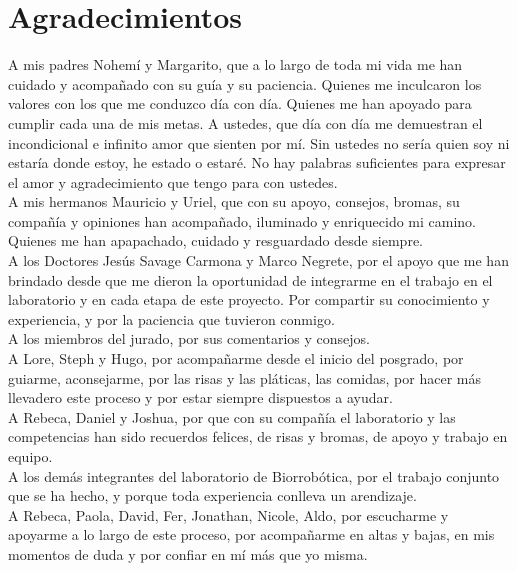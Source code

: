 \chapter*{Agradecimientos}

A mis padres Nohemí y Margarito, que a lo largo de toda mi vida me han cuidado y acompañado con su guía y su paciencia. Quienes me inculcaron los valores con los que me conduzco día con día. Quienes me han apoyado para cumplir cada una de mis metas. A ustedes, que día con día me demuestran el incondicional e infinito amor que sienten por mí. Sin ustedes no sería quien soy ni estaría donde estoy, he estado o estaré. No hay palabras suficientes para expresar el amor y agradecimiento que tengo para con ustedes.\\

A mis hermanos Mauricio y Uriel, que con su apoyo, consejos, bromas, su compañía y opiniones han acompañado, iluminado y enriquecido mi camino. Quienes me han apapachado, cuidado y resguardado desde siempre.\\

A los Doctores Jesús Savage Carmona y Marco Negrete, por el apoyo que me han brindado desde que me dieron la oportunidad de integrarme en el trabajo en el laboratorio y en cada etapa de este proyecto. Por compartir su conocimiento y experiencia, y por la paciencia que tuvieron conmigo.\\

A los miembros del jurado, por sus comentarios y consejos.\\

A Lore, Steph y Hugo, por acompañarme desde el inicio del posgrado, por guiarme, aconsejarme, por las risas y las pláticas, las comidas, por hacer más llevadero este proceso y por estar siempre dispuestos a ayudar.\\

A Rebeca, Daniel y Joshua, por que con su compañía el laboratorio y las competencias han sido recuerdos felices, de risas y bromas, de apoyo y trabajo en equipo.\\

A los demás integrantes del laboratorio de Biorrobótica, por el trabajo conjunto que se ha hecho, y porque toda experiencia conlleva un arendizaje.\\

A Rebeca, Paola, David, Fer, Jonathan, Nicole, Aldo, por escucharme y apoyarme a lo largo de este proceso, por acompañarme en altas y bajas, en mis momentos de duda y por confiar en mí más que yo misma.\\

